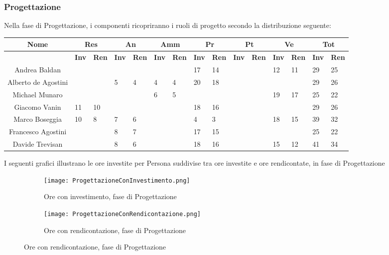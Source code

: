 \documentclass{scalatekids-article}
\begin{document}
\newpage
\subsubsection{Progettazione}
Nella fase di Progettazione, i componenti ricopriranno i ruoli di progetto secondo la distribuzione seguente:
\begin{center}
  \scriptsize
  \begin{tabular}{| c | p{0.35cm}  p{0.35cm} | p{0.35cm}  p{0.35cm} | p{0.35cm}  p{0.35cm} | p{0.35cm}  p{0.35cm} | p{0.35cm}  p{0.35cm} | p{0.35cm}  p{0.35cm} | p{0.35cm}  p{0.35cm} |}
    \hline
    \textbf{Nome} & \multicolumn{2}{|c|}{\textbf{Res}} & \multicolumn{2}{|c|}{\textbf{An}} & \multicolumn{2}{|c|}{\textbf{Amm}} & \multicolumn{2}{|c|}{\textbf{Pr}} & \multicolumn{2}{|c|}{\textbf{Pt}} & \multicolumn{2}{|c|}{\textbf{Ve}} & \multicolumn{2}{|c|}{\textbf{Tot}}\\
    \hline
    & \textbf{Inv} & \textbf{Ren} & \textbf{Inv} & \textbf{Ren} & \textbf{Inv} & \textbf{Ren} & \textbf{Inv} & \textbf{Ren} & \textbf{Inv} & \textbf{Ren} & \textbf{Inv} & \textbf{Ren} & \textbf{Inv} & \textbf{Ren}\\
    \hline
    Andrea Baldan & & & & & & & 17 & 14 & & & 12 & 11 & 29 & 25\\
    Alberto de Agostini & & & 5 & 4 & 4 & 4 & 20 & 18 & & & & & 29 & 26\\
    Michael Munaro & & & & & 6 & 5 & & & & & 19 & 17 & 25 & 22\\
    Giacomo Vanin & 11 & 10 & & & & & 18 & 16 & & & & & 29 & 26\\
    Marco Boseggia & 10 & 8 & 7 & 6 & & & 4 & 3 & & & 18 & 15 & 39 & 32\\
    Francesco Agostini & & & 8 & 7 & & & 17 & 15 & & & & & 25 & 22\\
    Davide Trevisan & & & 8 & 6 & & & 18 & 16 & & & 15 & 12 & 41 & 34\\
    \hline
  \end{tabular}
\end{center}
I seguenti grafici illustrano le ore investite per Persona suddivise tra ore investite e ore rendicontate, in fase di Progettazione
\begin{figure}[H]
  \begin{subfigure}[H]{0.47\textwidth}
    \texttt{[image: ProgettazioneConInvestimento.png]}
    \caption{Ore con investimento, fase di Progettazione}
  \end{subfigure}
  \qquad
  \begin{subfigure}[H]{0.47\textwidth}
    \texttt{[image: ProgettazioneConRendicontazione.png]}
    \caption{Ore con rendicontazione, fase di Progettazione}
  \end{subfigure}
\end{figure}
\newpage
\end{document}

